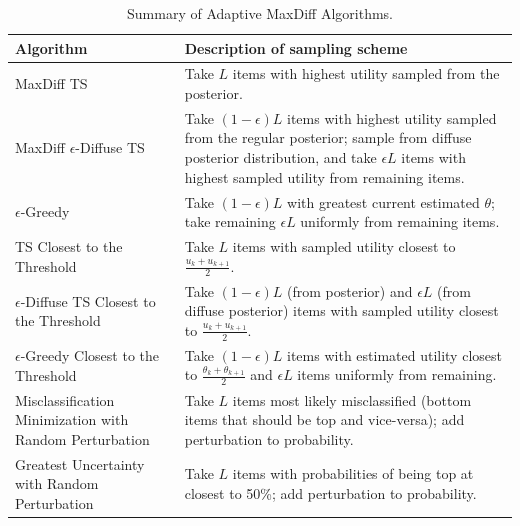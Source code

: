 \documentclass[nonblindrev]{informs3}
\newcommand{\numperset}{L}
\begin{document}
\begin{table}
\begin{tabular}{p{3in}|p{3in}}
Algorithm & Description of sampling scheme \\
\hline
MaxDiff TS & Take $\numperset$ items with highest utility sampled from the posterior.\\
MaxDiff $\epsilon$-Diffuse TS & Take $(1-\epsilon)L$ items with highest utility sampled from the regular posterior; sample from diffuse posterior distribution, and take $\epsilon L$ items with highest sampled utility from remaining items.\\
$\epsilon$-Greedy & Take $(1-\epsilon)L$ with greatest current estimated $\theta$; take remaining $\epsilon L$ uniformly from remaining items.\\
TS Closest to the Threshold & Take $\numperset$ items with sampled utility closest to $\frac{u_k+u_{k+1}}{2}$.\\
$\epsilon$-Diffuse TS Closest to the Threshold & Take $(1-\epsilon)L$ (from posterior) and  $\epsilon L$ (from diffuse posterior) items with sampled utility closest to $\frac{u_k+u_{k+1}}{2}$.\\
$\epsilon$-Greedy Closest to the Threshold & Take $(1-\epsilon)L$ items with estimated utility closest to $\frac{\theta_k+\theta_{k+1}}{2}$ and $\epsilon L$ items uniformly from remaining.\\
Misclassification Minimization with Random Perturbation& Take $\numperset$ items most likely misclassified (bottom items that should be top and vice-versa); add perturbation to probability.\\
Greatest Uncertainty with Random Perturbation& Take $\numperset$ items with probabilities of being top at closest to 50\%; add perturbation to probability.\\
\end{tabular}
\caption{Summary of Adaptive MaxDiff Algorithms.}\label{methods}
\end{table}




\end{document}
